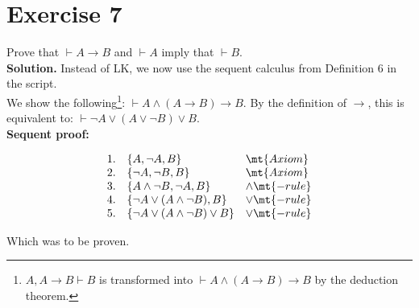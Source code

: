 \section{Exercise 7}

Prove that $\vdash A \rightarrow B$ and $\vdash A$ imply that $\vdash B$.\\

\noindent
\textbf{Solution.} Instead of LK, we now use the sequent calculus from Definition 6 in the script.\\

\noindent
We show the following\footnote{$A, A \rightarrow B \vdash B$ is transformed into $\vdash A \wedge (A \rightarrow B) \rightarrow B$ by the deduction theorem.}: $\vdash A \wedge (A \rightarrow B) \rightarrow B$. By the definition of $\rightarrow$, this is equivalent to: $\vdash \neg A \vee (A \vee \neg B) \vee B$.\\

\noindent
\textbf{Sequent proof:}

$$
	\begin{array}{l l l}
		1. & \{A,\neg A, B\} & \mt{Axiom}\\
		2. & \{\neg A, \neg B, B\} & \mt{Axiom}\\
		3. & \{A \wedge \neg B, \neg A, B\} & \wedge\mt{-rule }\\
		4. & \{\neg A \vee (A \wedge \neg B), B\} & \vee\mt{-rule}\\
		5. & \{\neg A \vee (A \wedge \neg B) \vee B\} & \vee\mt{-rule}\\
	\end{array}
$$

Which was to be proven.


